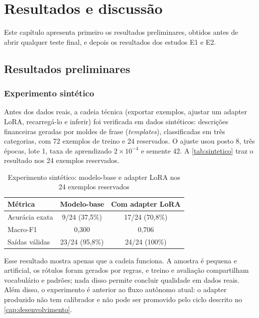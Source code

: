 \chapter{Resultados e discussão}
\label{cap:resultados}


Este capítulo apresenta primeiro os resultados preliminares, obtidos antes de abrir qualquer teste final, e depois os resultados dos estudos E1 e E2.

\section{Resultados preliminares}

\subsection{Experimento sintético}

Antes dos dados reais, a cadeia técnica (exportar exemplos, ajustar um adapter LoRA, recarregá-lo e inferir) foi verificada em dados sintéticos: descrições financeiras geradas por moldes de frase (\emph{templates}), classificadas em três categorias, com 72 exemplos de treino e 24 reservados. O ajuste usou posto 8, três épocas, lote 1, taxa de aprendizado $2\times10^{-4}$ e semente 42. A \autoref{tab:sintetico} traz o resultado nos 24 exemplos reservados.

\begin{table}[htb]
  \centering
  \caption{Experimento sintético: modelo-base e adapter LoRA nos 24 exemplos reservados}
  \label{tab:sintetico}
  \begin{tabular}{lcc}
    \toprule
    Métrica & Modelo-base & Com adapter LoRA \\
    \midrule
    Acurácia exata & 9/24 (37,5\%) & 17/24 (70,8\%) \\
    Macro-F1 & 0,300 & 0,706 \\
    Saídas válidas & 23/24 (95,8\%) & 24/24 (100\%) \\
    \bottomrule
  \end{tabular}
\end{table}

Esse resultado mostra apenas que a cadeia funciona. A amostra é pequena e artificial, os rótulos foram gerados por regras, e treino e avaliação compartilham vocabulário e padrões; nada disso permite concluir qualidade em dados reais. Além disso, o experimento é anterior ao fluxo autônomo atual: o adapter produzido não tem calibrador e não pode ser promovido pelo ciclo descrito no \autoref{cap:desenvolvimento}.

